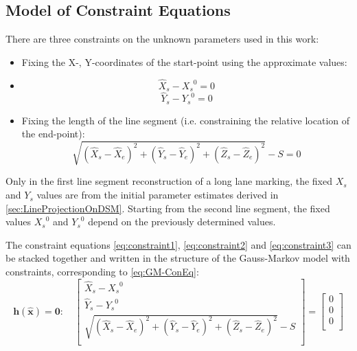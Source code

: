 \subsection{Model of Constraint Equations}
\label{subsec:ConEqua}


There are three constraints on the unknown parameters used in this work:
\begin{itemize}
\item Fixing the X-, Y-coordinates of the start-point using the approximate values:
\item [] \begin{equation} \label{eq:constraint1}
\hat{X}_s-{X_s}^0=0
\end{equation}
\begin{equation} \label{eq:constraint2}
\hat{Y}_s-{Y_s}^0=0
\end{equation}
\item Fixing the length of the line segment (i.e. constraining the relative location of the end-point):
\begin{equation} \label{eq:constraint3}
\sqrt{(\hat{X}_s-\hat{X}_e)^2+(\hat{Y}_s-\hat{Y}_e)^2+(\hat{Z}_s-\hat{Z}_e)^2}-S=0
\end{equation}
\end{itemize}

Only in the first line segment reconstruction of a long lane marking, the fixed $X_s$ and $Y_s$ values are from the initial parameter estimates derived in \cref{sec:LineProjectionOnDSM}. Starting from the second line segment, the fixed values ${X_s}^0$ and ${Y_s}^0$ depend on the previously determined values.

The constraint equations \eqref{eq:constraint1}, \eqref{eq:constraint2} and \eqref{eq:constraint3} can be stacked together and written in the structure of the Gauss-Markov model with constraints, corresponding to \cref{eq:GM-ConEq}:
\begin{equation} \label{eq:convec}
\boldsymbol h(\widehat{\boldsymbol x})=\mathbf{0}:\quad
\begin{bmatrix}
 \hat{X}_s-{X_s}^0\\[0.3em]
 \hat{Y}_s-{Y_s}^0\\[0.3em]
 \sqrt{(\hat{X}_s-\hat{X}_e)^2+(\hat{Y}_s-\hat{Y}_e)^2+(\hat{Z}_s-\hat{Z}_e)^2}-S\\[0.3em]
\end{bmatrix}
=
\begin{bmatrix}
 0\\[0.3em]
 0\\[0.3em]
 0\\[0.5em]
\end{bmatrix}
\end{equation}


